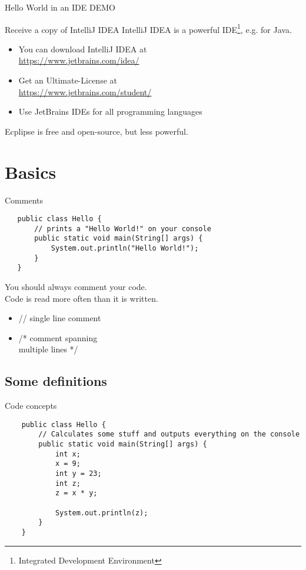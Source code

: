 \begin{frame}{Hello World in an IDE}
   DEMO
\end{frame}

\begin{frame}{Receive a copy of IntelliJ IDEA}
  IntelliJ IDEA is a powerful IDE\footnote{Integrated Development Environment}, e.g. for Java.
  \begin{itemize}
      \item You can download IntelliJ IDEA at  \\
          \url{https://www.jetbrains.com/idea/}
      \item Get an Ultimate-License at \\
          \url{https://www.jetbrains.com/student/}
      \item Use JetBrains IDEs for all programming languages
  \end{itemize}
  Ecplipse is free and open-source, but less powerful.
\end{frame}

\section{Basics}

\begin{frame}[fragile]{Comments}
   \begin{lstlisting}
   public class Hello {
       // prints a "Hello World!" on your console
       public static void main(String[] args) {
           System.out.println("Hello World!");
       }
   }
   \end{lstlisting}
   You should always comment your code. \\
   Code is read more often than it is written.
   \begin{itemize}
       \item // single line comment
       \item /* comment spanning \\
           multiple lines */
   \end{itemize}
\end{frame}

\subsection{Some definitions}

\begin{frame}[fragile]{Code concepts}
	\begin{lstlisting}
	public class Hello {
	    // Calculates some stuff and outputs everything on the console
	    public static void main(String[] args) {	        
	        int x;
	        x = 9;
	        int y = 23;
	        int z;
	        z = x * y;
	        
	        System.out.println(z);
	    }
	}
	\end{lstlisting}
\end{frame}


